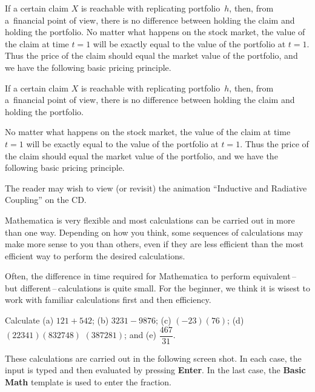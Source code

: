 \documentclass{Base}
\begin{document}
\begin{mibox}
If a certain claim $X$ is reachable with replicating
portfolio~$h$, then, from a~financial point of view, there is no
difference between holding the claim and holding the portfolio. No
matter what happens on the stock market, the value of the claim at
time $t=1$ will be exactly equal to the value of the portfolio at
$t=1$. Thus the price of the claim should equal the market value
of the portfolio, and we have the following basic pricing
principle.

If a certain claim $X$ is reachable with replicating
portfolio~$h$, then, from a~financial point of view, there is no
difference between holding the claim and holding the portfolio.

\vspace*{-1.5pt}

\brule

\cbend


\end{mibox}

No
matter what happens on the stock market, the value of the claim at
time $t=1$ will be exactly equal to the value of the portfolio at
$t=1$. Thus the price of the claim should equal the market value
of the portfolio, and we have the following basic pricing
principle.

The reader may wish to view (or revisit) the animation
``Inductive and Radiative Coupling'' on the CD.

\boxindent Mathematica is very flexible and most calculations can be carried
out in more than one way.  Depending on how you think, some
sequences of calculations may make more sense to you than others,
even if they are less efficient than the most efficient way to
perform the desired calculations.

Often, the difference in time
required for Mathematica to perform equivalent\,--\,but
different\,--\,calculations is quite small.  For the beginner, we
think it is wisest to work with familiar calculations first and
then efficiency.

\begin{exampled}
Calculate (a)  $121+542$; (b) $3231-9876$; (c)  $(-23)(76)$; (d)
$(22341)(832748)$ $(387281)$; and (e) $\dfrac{467}{31}$.
\end{exampled}

\begin{solution}
These calculations are carried out in the following screen shot.
In each case, the input is typed  and then evaluated by pressing
\textbf{Enter}.  In the last case, the \textbf{Basic Math}
template is used to enter the fraction.
\end{solution}
\end{document}
